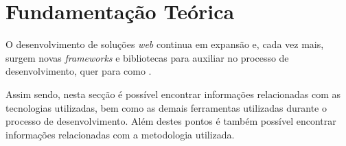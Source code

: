 \chapter{Fundamentação Teórica}

O desenvolvimento de soluções \textit{web} continua em expansão e, cada vez mais, surgem novas \textit{frameworks} e bibliotecas para auxiliar no processo de desenvolvimento, quer para \textit{} como \textit{}.

Assim sendo, nesta secção é possível encontrar informações relacionadas com as tecnologias utilizadas, bem como as demais ferramentas utilizadas durante o processo de desenvolvimento. Além destes pontos é também possível encontrar informações relacionadas com a metodologia utilizada.







